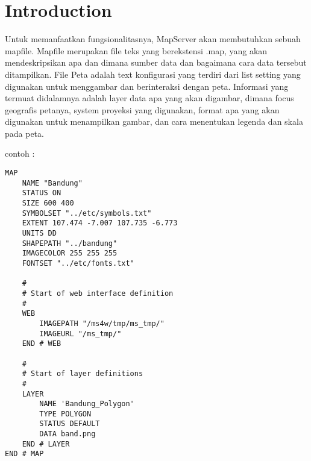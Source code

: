 ﻿\section{Introduction}

Untuk memanfaatkan fungsionalitasnya, MapServer akan membutuhkan sebuah mapfile. Mapfile merupakan file teks yang berekstensi .map,
yang akan mendeskripsikan apa dan dimana sumber data dan bagaimana cara data tersebut ditampilkan. 
File Peta adalah text konfigurasi yang terdiri dari list setting yang digunakan untuk menggambar dan berinteraksi dengan peta. 
Informasi yang termuat didalamnya adalah layer data apa yang akan digambar, dimana focus geografis petanya, 
system proyeksi yang digunakan, format apa yang akan digunakan untuk menampilkan gambar, dan cara menentukan legenda dan skala pada peta.

contoh :
\begin{verbatim}
MAP
    NAME "Bandung"
    STATUS ON
    SIZE 600 400
    SYMBOLSET "../etc/symbols.txt"
    EXTENT 107.474 -7.007 107.735 -6.773
    UNITS DD
    SHAPEPATH "../bandung"
    IMAGECOLOR 255 255 255
    FONTSET "../etc/fonts.txt"

    #
    # Start of web interface definition
    #
    WEB
        IMAGEPATH "/ms4w/tmp/ms_tmp/"
        IMAGEURL "/ms_tmp/"
    END # WEB

    #
    # Start of layer definitions
    #
    LAYER
        NAME 'Bandung_Polygon'
        TYPE POLYGON
        STATUS DEFAULT
        DATA band.png
    END # LAYER
END # MAP
\end{verbatim}

